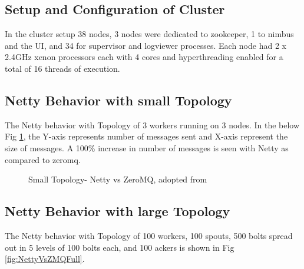 \documentclass[9pt,twocolumn,twoside]{../../styles/osajnl}
\begin{document}
\subsection{Setup and Configuration of Cluster}
In the cluster setup 38 nodes, 3 nodes were dedicated to zookeeper, 1
to nimbus and the UI, and 34 for supervisor and logviewer processes.
Each node had 2 x 2.4GHz xenon processors each with 4 cores and
hyperthreading enabled for a total of 16 threads of execution.

\subsection{Netty Behavior with small Topology}
The Netty behavior with Topology of 3 workers running on 3 nodes. In
the below Fig \ref{fig:nettyvzmq-small}, the Y-axis represents number
of messages sent and X-axis represent the size of messages. A 100\%
increase in number of messages is seen with Netty as compared to
zeromq.

\begin{figure}[htbp]
	\centering
	\caption{Small Topology- Netty vs ZeroMQ, adopted from
          \cite{article-storm-netty} }
	\label{fig:nettyvzmq-small}
\end{figure}



\subsection{Netty Behavior with large Topology}
The Netty behavior with Topology of 100 workers, 100 spouts, 500 bolts
spread out in 5 levels of 100 bolts each, and 100 ackers is shown in
Fig \ref{fig:NettyVsZMQFull}.
\end{document}
